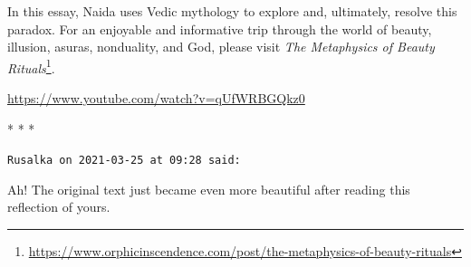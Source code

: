 In this essay, Naida uses Vedic mythology to explore and, ultimately, resolve this paradox. For an enjoyable and informative trip through the world of beauty, illusion, asuras, nonduality, and God, please visit \textit{The Metaphysics of Beauty Rituals}\footnote{\url{https://www.orphicinscendence.com/post/the-metaphysics-of-beauty-rituals}}.

\url{https://www.youtube.com/watch?v=qUfWRBGQkz0} 


\begin{center}* * *\end{center}

\begin{footnotesize}
\begin{sffamily}
\texttt{Rusalka on 2021-03-25 at 09:28 said:}

Ah! The original text just became even more beautiful after reading this reflection of yours.

\end{sffamily}
\end{footnotesize}

